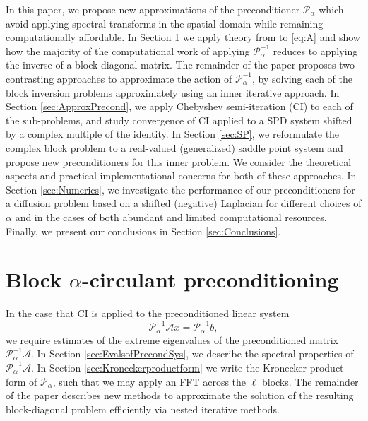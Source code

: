 \documentclass{article}
\theoremstyle{definition}
\begin{document}
	
	
	
	
	
	
	In this paper, we propose new approximations of the preconditioner $\mathcal{P}_{\alpha}$ which avoid applying {{spectral transforms}} in the spatial domain while remaining  computationally affordable.  
	In Section \ref{sec:Background} we apply theory from  \cite{liu2020fast, mcdonald2018preconditioning} to \eqref{eq:A} and show how the majority of the computational work of applying $\mathcal{P}_{\alpha}^{-1}$ reduces to applying the inverse of a block diagonal matrix.  The remainder of the paper proposes two contrasting approaches to approximate the action of $\mathcal{P}_{\alpha}^{-1}$, by solving each of the block inversion problems approximately using an inner iterative approach.  In Section \ref{sec:ApproxPrecond}, we apply Chebyshev semi-iteration (CI) to each of the sub-problems, and study convergence of CI applied to a SPD system shifted by a complex multiple of the identity. In Section \ref{sec:SP}, we reformulate the complex block problem to a real-valued (generalized) saddle point system and propose new preconditioners for this inner problem. 
	We consider the theoretical aspects and practical implementational concerns for both of these approaches.  In Section \ref{sec:Numerics}, we investigate the performance of our  preconditioners for a diffusion problem based on a shifted (negative) Laplacian for different choices of $\alpha$ and in the cases of {{both abundant and limited}} computational resources. Finally, we present our conclusions in Section \ref{sec:Conclusions}.
	
	
	
	\section{{Block $\alpha$-}circulant preconditioning}\label{sec:Background}
	
	
	In the case that CI is applied to the preconditioned linear system
	\begin{equation}
		\label{eq:precondsystem}
		\mathcal{P}_{\alpha}^{-1}  \mathcal{A} x = \mathcal{P}_{\alpha}^{-1} b, 
	\end{equation}
	we require estimates of the extreme eigenvalues of the preconditioned matrix $\mathcal{P}_{\alpha}^{-1}  \mathcal{A}$. 
	In Section \ref{sec:EvalsofPrecondSys}, we describe the spectral properties of $\mathcal{P}_\alpha^{-1}\mathcal{A}$. In Section \ref{sec:Kroneckerproductform} we write the Kronecker product form of $\mathcal{P}_\alpha$, such that we may apply an FFT across the $\ell$ blocks. 
	The remainder of the paper describes new methods to approximate the solution of the resulting block-diagonal problem efficiently via nested iterative methods.
	
\end{document}

